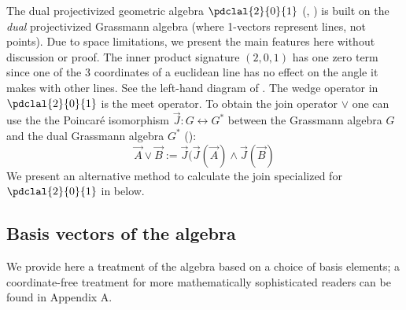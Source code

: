 \documentclass[12pt]{article}
\begin{document}
 {
The dual projectivized geometric algebra $\pdclal{2}{0}{1}$  (\cite{selig05}, \cite{gunn2011}) is built on the \emph{dual} projectivized Grassmann algebra (where 1-vectors represent lines, not points).   Due to space limitations, we present the main features here without discussion or proof.  The inner product  signature $(2,0,1)$ has one zero term since one of the 3 coordinates of a  euclidean line has no effect on the angle it makes with other lines. See the left-hand diagram of .   The wedge operator in $\pdclal{2}{0}{1}$ is the meet operator.  To obtain the join operator $\vee$ one can use the the Poincar\'{e} isomorphism $\vec{J}: G \leftrightarrow G^{*}$ between the Grassmann algebra  $G$ and the dual Grassmann algebra $G^{*}$ (\cite{gunnThesis}):
\[ \vec{A} \vee \vec{B} := \vec{J}(\vec{J}(\vec{A}) \wedge \vec{J}(\vec{B}) \]  We present an alternative method to calculate the join specialized for $\pdclal{2}{0}{1}$ in  below.
 }
 
%


\subsection{Basis vectors of the algebra}
\label{sec:bva}
We provide here a treatment of the algebra based on a choice of basis elements; a coordinate-free treatment for more mathematically sophisticated readers can be found in Appendix A.
\end{document}
